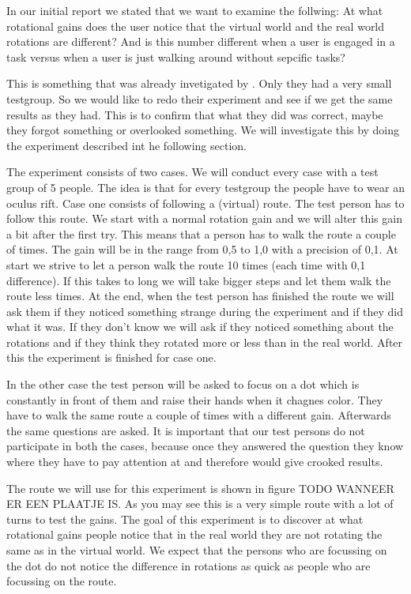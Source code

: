 In our initial report we stated that we want to examine the follwing:
At what rotational gains does the user notice that the virtual world and the real world rotations are different?
And is this number different when a user is engaged in a task versus when a user is just walking around without sepcific tasks?

This is something that was already invetigated by \cite{steinicke2}. Only they had a very small testgroup. So we would like to redo their experiment and see if we get the same results as they had. This is to confirm that what they did was correct, maybe they forgot something or overlooked something.  We will investigate this by doing the experiment described int he following section.

The experiment consists of two cases. We will conduct every case with a test group of 5 people. The idea is that for every testgroup the people have to wear an oculus rift. Case one consists of following a (virtual) route. The test person has to follow this route. We start with a normal rotation gain and we will alter this gain a bit after the first try. This means that a person has to walk the route a couple of times. The gain will be in the range from 0,5 to 1,0 with a precision of 0,1. At start we strive to let a person walk the route 10 times (each time with 0,1 difference). If this takes to long we will take bigger steps and let them walk the route less times. At the end, when the test person has finished the route we will ask them if they noticed something strange during the experiment and if they did what it was. If they don't know we will ask if they noticed something about the rotations and if they think they rotated more or less than in the real world. After this the experiment is finished for case one.

In the other case the test person will be asked to focus on a dot which is constantly in front of them and raise their hands when it chagnes color. They have to walk the same route a couple of times with a different gain. Afterwards the same questions are asked. It is important that our test persons do not participate in both the cases, because once they answered the question they know where they have to pay attention at and therefore would give crooked results.

The route we will use for this experiment is shown in figure TODO WANNEER ER EEN PLAATJE IS. As you may see this is a very simple route with a lot of turns to test the gains. The goal of this experiment is to discover at what rotational gains people notice that in the real world they are not rotating the same as in the virtual world. We expect that the persons who are focussing on the dot do not notice the difference in rotations as quick as people who are focussing on the route. 

